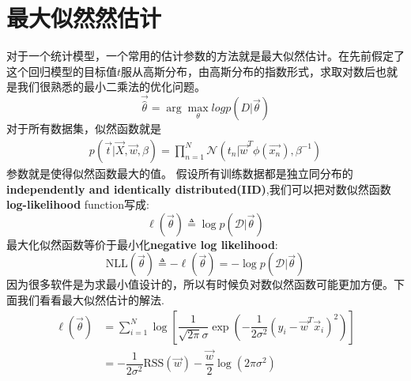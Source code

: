 \documentclass[a4paper]{article}
\begin{document}
\section{最大似然然估计}
对于一个统计模型，一个常用的估计参数的方法就是最大似然估计。在先前假定了这个回归模型的目标值$t$服从高斯分布，由高斯分布的指数形式，求取对数后也就是我们很熟悉的最小二乘法的优化问题。
\begin{equation}
\vec{\hat{\theta}}=\arg\max_\theta{logp(D|\vec{\theta})}
\end{equation}
对于所有数据集，似然函数就是
\begin{align}\label{eqn:linear regression likelihood}
p(\vec{t}|\vec{X},\vec{w},\beta) =
\prod_{n=1}^{N}\mathcal{N}(t_n|\vec{w}^T\phi(\vec{x_n}),\beta^{-1})
\end{align}
参数就是使得似然函数最大的值。
假设所有训练数据都是独立同分布的\textbf{independently and identically distributed(IID)},我们可以把对数似然函数\textbf{log-likelihood} function写成:
\begin{equation}
\ell(\vec{\theta}) \triangleq \log p(\mathcal{D}|\vec{\theta})
\end{equation}
最大化似然函数等价于最小化\textbf{negative log likelihood}:
\begin{equation}
\text{NLL}(\vec{\theta}) \triangleq -\ell(\vec{\theta})=-\log p(\mathcal{D}|\vec{\theta})
\end{equation}
因为很多软件是为求最小值设计的，所以有时候负对数似然函数可能更加方便。下面我们看看最大似然估计的解法.
\begin{align}
\ell(\vec{\theta})& =\sum\limits_{i=1}^N \log\left[\dfrac{1}{\sqrt{2\pi}\sigma}\exp\left(-\dfrac{1}{2\sigma^2}(y_i-\vec{w}^T\vec{x}_i)^2\right)\right] \\
& =-\dfrac{1}{2\sigma^2}\text{RSS}(\vec{w})-\dfrac{\vec{w}}{2}\log(2\pi\sigma^2)
\end{align}
\end{document}
